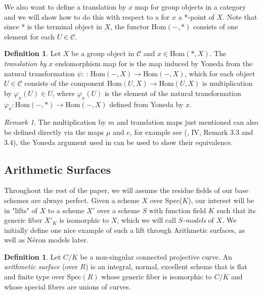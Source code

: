 \documentclass{article}
\theoremstyle{definition}
\newtheorem{definition}[theorem]{Definition}
\theoremstyle{remark}
\newtheorem*{remark}{Remark}
\theoremstyle{plain}
\newcommand{\mc}[1]{\mathcal{#1}}
\begin{document}
\indent 
We also want to define a translation by $x$ map for group objects in a category and we will show how to do this with respect to a for $x$ a $*$-point of $X$.
Note that since $*$ is the terminal object in $X$, the functor $\text{Hom}(-, *)$ consists of one element for each $U \in \mc{C}$.

\begin{definition}\label{def:translation}
	Let $X$ be a group object in $\mc{C}$ and $x \in \text{Hom}(*,X)$.
	The \textit{translation by $x$} endomorphism map for is the map induced by Yoneda from the natural transformation $\psi: \,:\, \text{Hom}(-,X) \to \text{Hom}(-,X)$, which for each object $U \in \mc{C}$ consists of the component $\text{Hom}(U,X) \to \text{Hom}(U,X)$ is multiplication by $\varphi_x(U) \in U$, where $\varphi_x(U)$ is the element of the natural transformation $\varphi_x: \text{Hom}(-,*) \to \text{Hom}(-,X)$ defined from Yoneda by $x$.
\end{definition}

\begin{remark}
	The multiplication by $m$ and translation maps just mentioned can also be defined directly via the maps $\mu$ and $e$, for example see (\cite{AEC2}, IV, Remark 3.3 and 3.4), the Yoneda argument used in  can be used to show their equivalence.
\end{remark}

\subsection{Arithmetic Surfaces}

Throughout the rest of the paper, we will assume the residue fields of our base schemes are always perfect.
Given a scheme $X$ over Spec($K$), our interest will be in "lifts" of $X$ to a scheme $X'$ over a scheme $S$ with function field $K$ such that its generic fiber $X'_K$ is isomorphic to $X$, which we will call \textit{$S$-models} of $X$.  
We initially define one nice example of such a lift through Arithmetic surfaces, as well as N\'eron models later.


\begin{definition}
	Let $C/K$ be a non-singular connected projective curve. 
	An \textit{arithmetic surface} (over $R$) is an integral, normal, excellent scheme that is flat and finite type over $\text{Spec}(R)$ whose generic fiber is isomorphic to $C/K$ and whose special fibers are unions of curves.
\end{definition}
\end{document}

